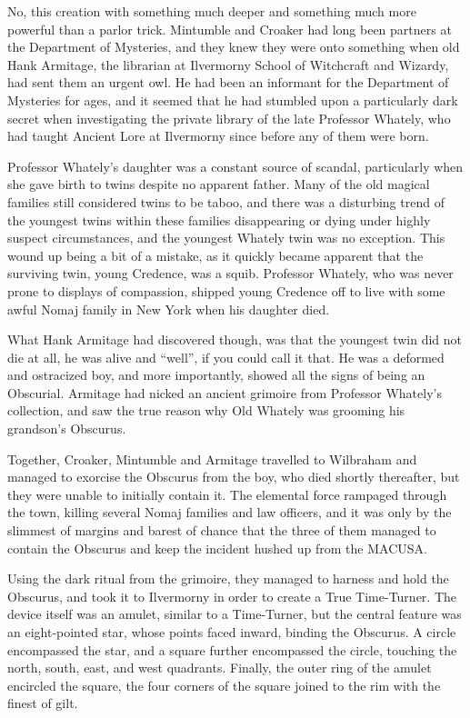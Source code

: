 No, this creation with something much deeper and something much more powerful than a parlor trick. Mintumble and Croaker had long been partners at the Department of Mysteries, and they knew they were onto something when old Hank Armitage, the librarian at Ilvermorny School of Witchcraft and Wizardy, had sent them an urgent owl. He had been an informant for the Department of Mysteries for ages, and it seemed that he had stumbled upon a particularly dark secret when investigating the private library of the late Professor Whately, who had taught Ancient Lore at Ilvermorny since before any of them were born.

Professor Whately’s daughter was a constant source of scandal, particularly when she gave birth to twins despite no apparent father. Many of the old magical families still considered twins to be taboo, and there was a disturbing trend of the youngest twins within these families disappearing or dying under highly suspect circumstances, and the youngest Whately twin was no exception. This wound up being a bit of a mistake, as it quickly became apparent that the surviving twin, young Credence, was a squib. Professor Whately, who was never prone to displays of compassion, shipped young Credence off to live with some awful Nomaj family in New York when his daughter died.

What Hank Armitage had discovered though, was that the youngest twin did not die at all, he was alive and “well”, if you could call it that. He was a deformed and ostracized boy, and more importantly, showed all the signs of being an Obscurial. Armitage had nicked an ancient grimoire from Professor Whately’s collection, and saw the true reason why Old Whately was grooming his grandson’s Obscurus.

Together, Croaker, Mintumble and Armitage travelled to Wilbraham and managed to exorcise the Obscurus from the boy, who died shortly thereafter, but they were unable to initially contain it. The elemental force rampaged through the town, killing several Nomaj families and law officers, and it was only by the slimmest of margins and barest of chance that the three of them managed to contain the Obscurus and keep the incident hushed up from the MACUSA.

Using the dark ritual from the grimoire, they managed to harness and hold the Obscurus, and took it to Ilvermorny in order to create a True Time-Turner. The device itself was an amulet, similar to a Time-Turner, but the central feature was an eight-pointed star, whose points faced inward, binding the Obscurus. A circle encompassed the star, and a square further encompassed the circle, touching the north, south, east, and west quadrants. Finally, the outer ring of the amulet encircled the square, the four corners of the square joined to the rim with the finest of gilt.

